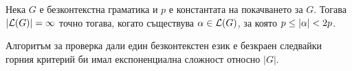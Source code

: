 \begin{cor}
  Нека $G$ е безконтекстна граматика и $p$ е константата на покачването за $G$.
  Тогава $\vert{\mathcal{L}(G)}\vert = \infty$ точно тогава, когато съществува $\alpha \in \mathcal{L}(G)$, за която $p \leq \vert{\alpha}\vert < 2p$.
\end{cor}



\begin{remark}
  Алгоритъм за проверка дали един безконтекстен език е безкраен следвайки горния критерий би 
  имал експоненциална сложност относно $|G|$.
\end{remark}

